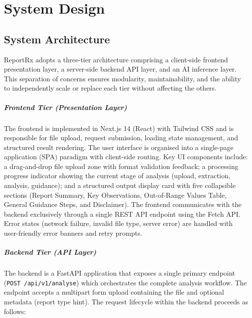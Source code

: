 \chapter{System Design}

\section{System Architecture}
ReportRx adopts a three-tier architecture comprising a client-side frontend presentation layer, a server-side backend API layer, and an AI inference layer. This separation of concerns ensures modularity, maintainability, and the ability to independently scale or replace each tier without affecting the others.

\paragraph{Frontend Tier (Presentation Layer)}
The frontend is implemented in Next.js 14 (React) with Tailwind CSS and is responsible for file upload, request submission, loading state management, and structured result rendering. The user interface is organised into a single-page application (SPA) paradigm with client-side routing. Key UI components include: a drag-and-drop file upload zone with format validation feedback; a processing progress indicator showing the current stage of analysis (upload, extraction, analysis, guidance); and a structured output display card with five collapsible sections (Report Summary, Key Observations, Out-of-Range Values Table, General Guidance Steps, and Disclaimer). The frontend communicates with the backend exclusively through a single REST API endpoint using the Fetch API. Error states (network failure, invalid file type, server error) are handled with user-friendly error banners and retry prompts.

\paragraph{Backend Tier (API Layer)}
The backend is a FastAPI application that exposes a single primary endpoint (\texttt{POST /api/v1/analyse}) which orchestrates the complete analysis workflow. The endpoint accepts a multipart form upload containing the file and optional metadata (report type hint). The request lifecycle within the backend proceeds as follows:

